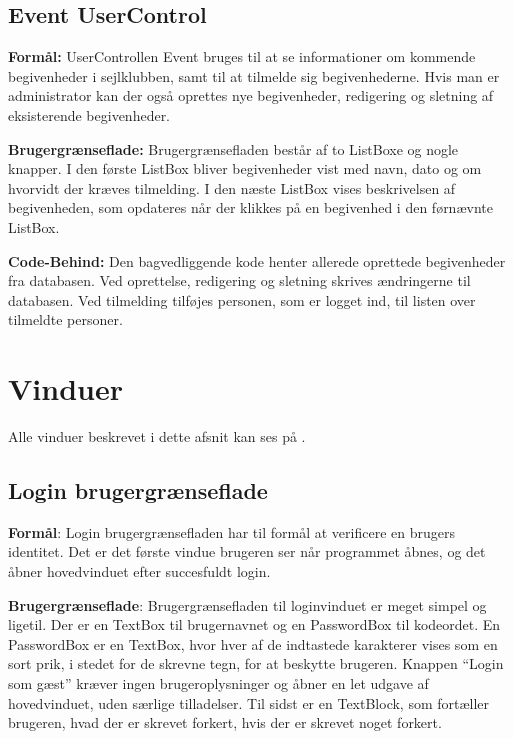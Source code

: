 \subsection{Event UserControl}
\textbf{Formål:}
UserControllen Event bruges til at se informationer om kommende begivenheder i sejlklubben, samt til at tilmelde sig begivenhederne. 
Hvis man er administrator kan der også oprettes nye begivenheder, redigering og sletning af eksisterende begivenheder.

\textbf{Brugergrænseflade:}
Brugergrænsefladen består af to ListBoxe og nogle knapper.
I den første ListBox bliver begivenheder vist med navn, dato og om  hvorvidt der kræves tilmelding.
I den næste ListBox vises beskrivelsen af begivenheden, som opdateres når der klikkes på en begivenhed i den førnævnte ListBox. 

\textbf{Code-Behind:}
Den bagvedliggende kode henter allerede oprettede begivenheder fra databasen. 
Ved oprettelse, redigering og sletning skrives ændringerne til databasen. 
Ved tilmelding tilføjes personen, som er logget ind, til listen over tilmeldte personer. 

\section{Vinduer}
Alle vinduer beskrevet i dette afsnit kan ses på . 

\subsection{Login brugergrænseflade} 
 
\textbf{Formål}:
Login brugergrænsefladen har til formål at verificere en brugers identitet. 
Det er det første vindue brugeren ser når programmet åbnes, og det åbner hovedvinduet efter succesfuldt login.
 
\textbf{Brugergrænseflade}: 
Brugergrænsefladen til loginvinduet er meget simpel og ligetil. 
Der er en TextBox til brugernavnet og en PasswordBox til kodeordet.
En PasswordBox er en TextBox, hvor hver af de indtastede karakterer vises som en sort prik, i stedet for de skrevne tegn, for at beskytte brugeren.
Knappen ``Login som gæst'' kræver ingen brugeroplysninger og åbner en let udgave af hovedvinduet, uden særlige tilladelser.
Til sidst er en TextBlock, som fortæller brugeren, hvad der er skrevet forkert, hvis der er skrevet noget forkert.

